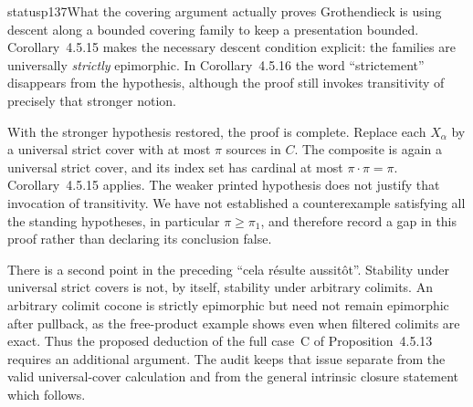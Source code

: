 \begin{dcomment}{status}{p137}{What the covering argument actually proves}
Grothendieck is using descent along a bounded covering family to keep a presentation bounded. Corollary~4.5.15 makes the necessary descent condition explicit: the families are universally \emph{strictly} epimorphic. In Corollary~4.5.16 the word ``strictement'' disappears from the hypothesis, although the proof still invokes transitivity of precisely that stronger notion.

With the stronger hypothesis restored, the proof is complete. Replace each $X_\alpha$ by a universal strict cover with at most $\pi$ sources in $C$. The composite is again a universal strict cover, and its index set has cardinal at most $\pi\cdot\pi=\pi$. Corollary~4.5.15 applies. The weaker printed hypothesis does not justify that invocation of transitivity. We have not established a counterexample satisfying all the standing hypotheses, in particular $\pi\geq\pi_1$, and therefore record a gap in this proof rather than declaring its conclusion false.

There is a second point in the preceding ``cela r\'esulte aussit\^ot''. Stability under universal strict covers is not, by itself, stability under arbitrary colimits. An arbitrary colimit cocone is strictly epimorphic but need not remain epimorphic after pullback, as the free-product example shows even when filtered colimits are exact. Thus the proposed deduction of the full case~C of Proposition~4.5.13 requires an additional argument. The audit keeps that issue separate from the valid universal-cover calculation and from the general intrinsic closure statement which follows.
\end{dcomment}


